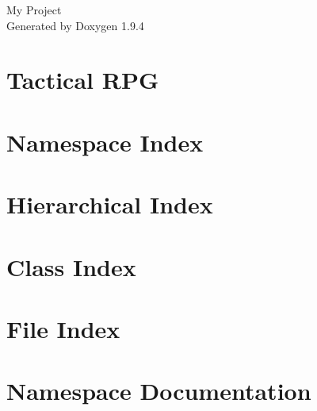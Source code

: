 \documentclass[twoside]{book}
\newcommand{\+}{\discretionary{\mbox{\scriptsize$\hookleftarrow$}}{}{}}
\newcommand{\clearemptydoublepage}{%
    \newpage{\pagestyle{empty}\cleardoublepage}%
  }
\begin{document}
  \raggedbottom
    \hypersetup{pageanchor=false,
                bookmarksnumbered=true,
                pdfencoding=unicode
               }
  \begin{titlepage}
  \vspace*{7cm}
  \begin{center}%
  {\Large My Project}\\
  \vspace*{1cm}
  {\large Generated by Doxygen 1.9.4}\\
  \end{center}
  \end{titlepage}
  \clearemptydoublepage
  \tableofcontents
  \clearemptydoublepage
  \hypersetup{pageanchor=true}
\chapter{Tactical RPG}
\label{md__c___users_doria_source_repos__tactical_r_p_g__r_e_a_d_m_e}

\chapter{Namespace Index}

\chapter{Hierarchical Index}

\chapter{Class Index}

\chapter{File Index}

\chapter{Namespace Documentation}

\end{document}
